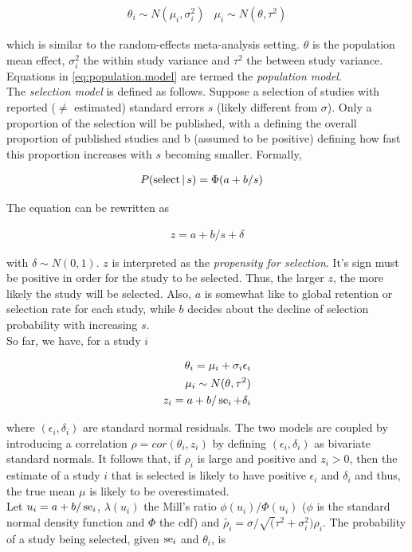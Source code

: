 \documentclass[11pt,a4paper,twoside]{book}\usepackage[]{graphicx}\usepackage[]{color}
\begin{document}
\begin{align}
\theta_i \sim N(\mu_i, \sigma_i^2) &
\mu_i \sim N(\theta, \tau^2) \label{eq:population.model}
\end{align}

which is similar to the random-effects meta-analysis setting. $\theta$ is the population mean effect, $\sigma_i^2$ the within study variance and $\tau^2$ the between study variance. Equations in \ref{eq:population.model} are termed the \textit{population model}. \\
The \textit{selection model} is defined as follows. Suppose a selection of studies with reported ($\neq$ estimated) standard errors $s$ (likely different from $\sigma$). Only a proportion of the selection will be published, with a defining the overall proportion of published studies and b (assumed to be positive) defining how fast this proportion increases with $s$ becoming smaller. Formally,

\begin{align}
P(\textrm{select}\given s) &= \Phi(a + b/s) \nonumber %
\end{align}

The equation can be rewritten as 

\begin{align}
z = a + b/s + \delta \nonumber %
\end{align}

with $\delta \sim N(0,1)$. $z$ is interpreted as the \textit{propensity for selection}. It's sign must be positive in order for the study to be selected. Thus, the larger $z$, the more likely the study will be selected. Also, $a$ is somewhat like to global retention or selection rate for each study, while $b$ decides about the decline of selection probability with increasing $s$.\\
So far, we have, for a study $i$

\begin{align}
\theta_i = \mu_i + \sigma_i\epsilon_i \nonumber \\ 
\mu_i \sim N(\theta, \tau^2) \nonumber \\
z_i = a + b/\operatorname{se}_i + \delta_i \nonumber
\end{align}

where $(\epsilon_i, \delta_i)$ are standard normal residuals. The two models are coupled by introducing a correlation $\rho = cor(\theta_i, z_i)$ by defining $(\epsilon_i, \delta_i)$ as bivariate standard normals. It follows that,
if $\rho_i$ is large and positive and $z_i > 0$, then the estimate of a study $i$ that is selected is likely to have positive $\epsilon_i$ and $\delta_i$ and thus, the true mean $\mu$ is likely to be overestimated. \\
Let $u_i = a + b/\operatorname{se}_i$, $\lambda(u_i)$ the Mill's ratio $\phi(u_i)/\Phi(u_i)$ ($\phi$ is the standard normal density function and $\Phi$ the cdf) and $\tilde{\rho_i} = \sigma/\sqrt(\tau^2 + \sigma_i^2) \rho_i$. The probability of a study being selected, given $\operatorname{se}_i$ and $\theta_i$, is
\end{document}
